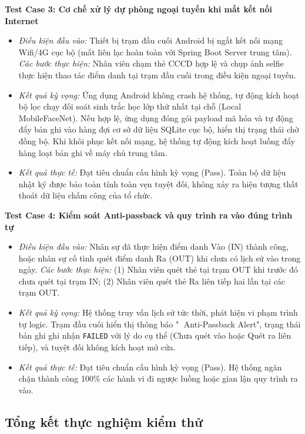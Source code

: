 \documentclass[../DoAn.tex]{subfiles}
\begin{document}
\textbf{Test Case 3: Cơ chế xử lý dự phòng ngoại tuyến khi mất kết nối Internet}
\begin{itemize}
    \item \textit{Điều kiện đầu vào:} Thiết bị trạm đầu cuối Android bị ngắt kết nối mạng Wifi/4G cục bộ (mất liên lạc hoàn toàn với Spring Boot Server trung tâm).
    \textit{Các bước thực hiện:} Nhân viên chạm thẻ CCCD hợp lệ và chụp ảnh selfie thực hiện thao tác điểm danh tại trạm đầu cuối trong điều kiện ngoại tuyến.
    \item \textit{Kết quả kỳ vọng:} Ứng dụng Android không crash hệ thống, tự động kích hoạt bộ lọc chạy đối soát sinh trắc học lớp thứ nhất tại chỗ (Local MobileFaceNet). Nếu hợp lệ, ứng dụng đóng gói payload mã hóa và tự động đẩy bản ghi vào hàng đợi cơ sở dữ liệu SQLite cục bộ, hiển thị trạng thái chờ đồng bộ. Khi khôi phục kết nối mạng, hệ thống tự động kích hoạt luồng đẩy hàng loạt bản ghi về máy chủ trung tâm.
    \item \textit{Kết quả thực tế:} Đạt tiêu chuẩn cấu hình kỳ vọng (Pass). Toàn bộ dữ liệu nhật ký được bảo toàn tính toàn vẹn tuyệt đối, không xảy ra hiện tượng thất thoát dữ liệu chấm công của tổ chức.
\end{itemize}

\textbf{Test Case 4: Kiểm soát Anti-passback và quy trình ra vào đúng trình tự}
\begin{itemize}
    \item \textit{Điều kiện đầu vào:} Nhân sự đã thực hiện điểm danh Vào (IN) thành công, hoặc nhân sự cố tình quét điểm danh Ra (OUT) khi chưa có lịch sử vào trong ngày.
    \textit{Các bước thực hiện:} (1) Nhân viên quét thẻ tại trạm OUT khi trước đó chưa quét tại trạm IN; (2) Nhân viên quét thẻ Ra liên tiếp hai lần tại các trạm OUT.
    \item \textit{Kết quả kỳ vọng:} Hệ thống truy vấn lịch sử tức thời, phát hiện vi phạm trình tự logic. Trạm đầu cuối hiển thị thông báo "🚫 Anti-Passback Alert", trạng thái bản ghi ghi nhận \texttt{FAILED} với lý do cụ thể (Chưa quét vào hoặc Quét ra liên tiếp), và tuyệt đối không kích hoạt mở cửa.
    \item \textit{Kết quả thực tế:} Đạt tiêu chuẩn cấu hình kỳ vọng (Pass). Hệ thống ngăn chặn thành công 100\% các hành vi đi ngược luồng hoặc gian lận quy trình ra vào.
\end{itemize}

\subsection{Tổng kết thực nghiệm kiểm thử}
\end{document}
